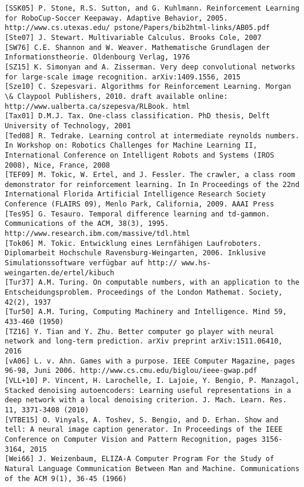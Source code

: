 \documentclass[10pt]{article}
\begin{document}
\begin{verbatim}
[SSK05] P. Stone, R.S. Sutton, and G. Kuhlmann. Reinforcement Learning for RoboCup-Soccer Keepaway. Adaptive Behavior, 2005. http://www.cs.utexas.edu/ pstone/Papers/bib2html-links/AB05.pdf
[Ste07] J. Stewart. Multivariable Calculus. Brooks Cole, 2007
[SW76] C.E. Shannon and W. Weaver. Mathematische Grundlagen der Informationstheorie. Oldenbourg Verlag, 1976
[SZ15] K. Simonyan and A. Zisserman. Very deep convolutional networks for large-scale image recognition. arXiv:1409.1556, 2015
[Sze10] C. Szepesvari. Algorithms for Reinforcement Learning. Morgan \& Claypool Publishers, 2010. draft available online: http://www.ualberta.ca/szepesva/RLBook. html
[Tax01] D.M.J. Tax. One-class classification. PhD thesis, Delft University of Technology, 2001
[Ted08] R. Tedrake. Learning control at intermediate reynolds numbers. In Workshop on: Robotics Challenges for Machine Learning II, International Conference on Intelligent Robots and Systems (IROS 2008), Nice, France, 2008
[TEF09] M. Tokic, W. Ertel, and J. Fessler. The crawler, a class room demonstrator for reinforcement learning. In In Proceedings of the 22nd International Florida Artificial Intelligence Research Society Conference (FLAIRS 09), Menlo Park, California, 2009. AAAI Press
[Tes95] G. Tesauro. Temporal difference learning and td-gammon. Communications of the ACM, 38(3), 1995. http://www.research.ibm.com/massive/tdl.html
[Tok06] M. Tokic. Entwicklung eines Lernfähigen Laufroboters. Diplomarbeit Hochschule Ravensburg-Weingarten, 2006. Inklusive Simulationssoftware verfügbar auf http:// www.hs-weingarten.de/ertel/kibuch
[Tur37] A.M. Turing. On computable numbers, with an application to the Entscheidungsproblem. Proceedings of the London Mathemat. Society, 42(2), 1937
[Tur50] A.M. Turing, Computing Machinery and Intelligence. Mind 59, 433-460 (1950)
[TZ16] Y. Tian and Y. Zhu. Better computer go player with neural network and long-term prediction. arXiv preprint arXiv:1511.06410, 2016
[vA06] L. v. Ahn. Games with a purpose. IEEE Computer Magazine, pages 96-98, Juni 2006. http://www.cs.cmu.edu/biglou/ieee-gwap.pdf
[VLL+10] P. Vincent, H. Larochelle, I. Lajoie, Y. Bengio, P. Manzagol, Stacked denoising autoencoders: Learning useful representations in a deep network with a local denoising criterion. J. Mach. Learn. Res. 11, 3371-3408 (2010)
[VTBE15] O. Vinyals, A. Toshev, S. Bengio, and D. Erhan. Show and tell: A neural image caption generator. In Proceedings of the IEEE Conference on Computer Vision and Pattern Recognition, pages 3156-3164, 2015
[Wei66] J. Weizenbaum, ELIZA-A Computer Program For the Study of Natural Language Communication Between Man and Machine. Communications of the ACM 9(1), 36-45 (1966)

\end{verbatim}
\end{document}
